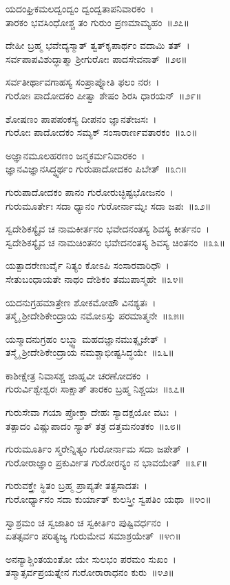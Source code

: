 ಯದಂಘ್ರಿಕಮಲದ್ವಂದ್ವಂ ದ್ವಂದ್ವತಾಪನಿವಾರಕಂ~।\\
ತಾರಕಂ ಭವಸಿಂಧೋಶ್ಚ ತಂ ಗುರುಂ ಪ್ರಣಮಾಮ್ಯಹಂ~॥೨೭॥

ದೇಹೀ ಬ್ರಹ್ಮ ಭವೇದ್ಯಸ್ಮಾತ್ ತ್ವತ್‌ಕೃಪಾರ್ಥಂ ವದಾಮಿ ತತ್~।\\
ಸರ್ವಪಾಪವಿಶುದ್ಧಾತ್ಮಾ ಶ್ರೀಗುರೋಃ ಪಾದಸೇವನಾತ್~॥೨೮॥

ಸರ್ವತೀರ್ಥಾವಗಾಹಸ್ಯ ಸಂಪ್ರಾಪ್ನೋತಿ ಫಲಂ ನರಃ~।\\
ಗುರೋಃ ಪಾದೋದಕಂ ಪೀತ್ವಾ ಶೇಷಂ ಶಿರಸಿ ಧಾರಯನ್~॥೨೯॥

ಶೋಷಣಂ ಪಾಪಪಂಕಸ್ಯ ದೀಪನಂ ಜ್ಞಾನತೇಜಸಃ~।\\
ಗುರೋಃ ಪಾದೋದಕಂ ಸಮ್ಯಕ್ ಸಂಸಾರಾರ್ಣವತಾರಕಂ~॥೩೦॥

ಅಜ್ಞಾನಮೂಲಹರಣಂ ಜನ್ಮಕರ್ಮನಿವಾರಕಂ~।\\
ಜ್ಞಾನವಿಜ್ಞಾನಸಿದ್ಧ್ಯರ್ಥಂ ಗುರುಪಾದೋದಕಂ ಪಿಬೇತ್~॥೩೧॥

ಗುರುಪಾದೋದಕಂ ಪಾನಂ ಗುರೋರುಚ್ಛಿಷ್ಟಭೋಜನಂ~।\\
ಗುರುಮೂರ್ತೇಃ ಸದಾ ಧ್ಯಾನಂ ಗುರೋರ್ನಾಮ್ನಃ ಸದಾ ಜಪಃ~॥೩೨॥

ಸ್ವದೇಶಿಕಸ್ಯೈವ ಚ ನಾಮಕೀರ್ತನಂ ಭವೇದನಂತಸ್ಯ ಶಿವಸ್ಯ ಕೀರ್ತನಂ~।\\
ಸ್ವದೇಶಿಕಸ್ಯೈವ ಚ ನಾಮಚಿಂತನಂ ಭವೇದನಂತಸ್ಯ ಶಿವಸ್ಯ ಚಿಂತನಂ~॥೩೩॥

ಯತ್ಪಾದರೇಣುರ್ವೈ ನಿತ್ಯಂ ಕೋಽಪಿ ಸಂಸಾರವಾರಿಧೌ~।\\
ಸೇತುಬಂಧಾಯತೇ ನಾಥಂ ದೇಶಿಕಂ ತಮುಪಾಸ್ಮಹೇ~॥೩೪॥

ಯದನುಗ್ರಹಮಾತ್ರೇಣ ಶೋಕಮೋಹೌ ವಿನಶ್ಯತಃ~।\\
ತಸ್ಮೈ ಶ್ರೀದೇಶಿಕೇಂದ್ರಾಯ ನಮೋಽಸ್ತು ಪರಮಾತ್ಮನೇ~॥೩೫॥

ಯಸ್ಮಾದನುಗ್ರಹಂ ಲಬ್ಧ್ವಾ ಮಹದಜ್ಞಾನಮುತ್ಸೃಜೇತ್~।\\
ತಸ್ಮೈ ಶ್ರೀದೇಶಿಕೇಂದ್ರಾಯ ನಮಶ್ಚಾಭೀಷ್ಟಸಿದ್ಧಯೇ~॥೩೬॥

ಕಾಶೀಕ್ಷೇತ್ರ ನಿವಾಸಶ್ಚ ಜಾಹ್ನವೀ ಚರಣೋದಕಂ~।\\
ಗುರುರ್ವಿಶ್ವೇಶ್ವರಃ ಸಾಕ್ಷಾತ್ ತಾರಕಂ ಬ್ರಹ್ಮ ನಿಶ್ಚಯಃ~॥೩೭॥

ಗುರುಸೇವಾ ಗಯಾ ಪ್ರೋಕ್ತಾ ದೇಹಃ ಸ್ಯಾದಕ್ಷಯೋ ವಟಃ~।\\
ತತ್ಪಾದಂ ವಿಷ್ಣುಪಾದಂ ಸ್ಯಾತ್ ತತ್ರ ದತ್ತಮನಂತಕಂ~॥೩೮॥

ಗುರುಮೂರ್ತಿಂ ಸ್ಮರೇನ್ನಿತ್ಯಂ ಗುರೋರ್ನಾಮ ಸದಾ ಜಪೇತ್~।\\
ಗುರೋರಾಜ್ಞಾಂ ಪ್ರಕುರ್ವೀತ ಗುರೋರನ್ಯಂ ನ ಭಾವಯೇತ್~॥೩೯॥

ಗುರುವಕ್ತ್ರೇ ಸ್ಥಿತಂ ಬ್ರಹ್ಮ ಪ್ರಾಪ್ಯತೇ ತತ್ಪ್ರಸಾದತಃ~।\\
ಗುರೋರ್ಧ್ಯಾನಂ ಸದಾ ಕುರ್ಯಾತ್ ಕುಲಸ್ತ್ರೀ ಸ್ವಪತಿಂ ಯಥಾ~॥೪೦॥

ಸ್ವಾಶ್ರಮಂ ಚ ಸ್ವಜಾತಿಂ ಚ ಸ್ವಕೀರ್ತಿಂ ಪುಷ್ಟಿವರ್ಧನಂ~।\\
ಏತತ್ಸರ್ವಂ ಪರಿತ್ಯಜ್ಯ ಗುರುಮೇವ ಸಮಾಶ್ರಯೇತ್~॥೪೧॥

ಅನನ್ಯಾಶ್ಚಿಂತಯಂತೋ ಯೇ ಸುಲಭಂ ಪರಮಂ ಸುಖಂ~।\\
ತಸ್ಮಾತ್ಸರ್ವಪ್ರಯತ್ನೇನ ಗುರೋರಾರಾಧನಂ ಕುರು~॥೪೨॥


